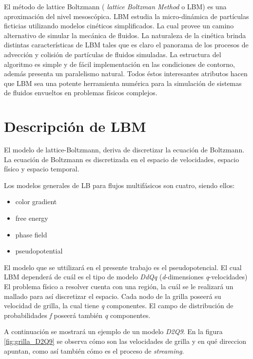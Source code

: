 El método de lattice Boltzmann ( \textit{lattice Boltzman Method} o LBM) es una aproximación del nivel mesoscópica. LBM estudia la micro-dinámica de partículas ficticias utilizando modelos cinéticos simplificados. La cual provee un camino alternativo de simular la mecánica de fluidos. La naturaleza de la cinética brinda distintas características de LBM tales que es claro el panorama de los procesos de advección y colisión de partículas de fluidos simuladas. La estructura del algoritmo es simple y de fácil implementación en las condiciones de contorno, además presenta un paralelismo natural. Todos éstos interesantes atributos hacen que LBM sea una potente herramienta numérica para la simulación de sistemas de fluidos envueltos en problemas físicos complejos. \cite{guo2013lattice}


\section{Descripción de LBM}

El modelo de lattice-Boltzmann, deriva de discretizar la ecuación de Boltzmann. La ecuación de Boltzmann es discretizada en el espacio de velocidades, espacio físico y espacio temporal.

Los modelos generales de LB para flujos multifásicos son cuatro, siendo ellos:

\begin{itemize}
	\item color gradient
	\item free energy
	\item phase field
	\item pseudopotential
\end{itemize}

El modelo que se uttilizará en el presente trabajo es el pseudopotencial. El cual  LBM dependerá de cuál es el tipo de modelo \textit{DdQq} (\textit{d}-dimensiones  \textit{q}-velocidades)
El problema físico a resolver cuenta con una región, la cuál se le realizará un mallado para así discretizar el espacio. Cada nodo de la grilla poseerá su velocidad de grilla, la cual tiene \textit{q} componentes. El campo de distribución de probabilidades \textit{f} poseerá también \textit{q} componentes.

A continuación se mostrará un ejemplo de un modelo \textit{D2Q9}. En la figura \ref{fig:grilla_D2Q9} se observa cómo son las velocidades de grilla y en qué direccion apuntan, como así también cómo es el proceso de \textit{streaming}.

